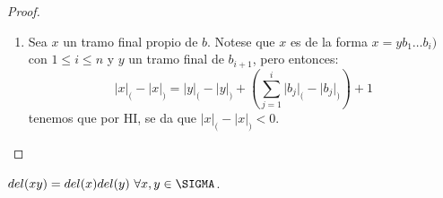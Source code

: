 \begin{proof}
\begin{enumerate}[(1)]
      \item Sea $x$ un tramo final propio de $b$. Notese que $x$ es de la forma $x = y b_{1} \dotsc b_{i})$ con
        $1 \leq i \leq n$ y $y$ un tramo final de $b_{i+1}$, pero entonces:
        \[
          \lvert x \rvert_{(} - \lvert x \rvert_{)} = \lvert y \rvert_{(} - \lvert y \rvert_{)} + \left(\sum_{j=1}^{i}
          \lvert b_{j} \rvert_{(} - \lvert b_{j} \rvert_{)}\right) + 1
        \]
      tenemos que por HI, se da que $\lvert x \rvert_{(} - \lvert x \rvert_{)} < 0$.
    \end{enumerate}
  \end{proof}

  \begin{lemma}
    \PN $del(xy) = del(x)del(y) \ \forall x, y \in \SIGMA$.
  \end{lemma}

